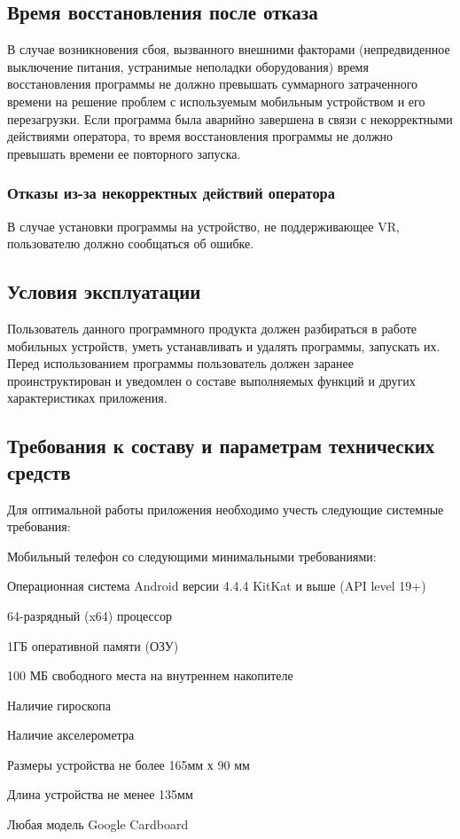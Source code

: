 \subsection{Время восстановления после отказа}
В случае возникновения сбоя, вызванного внешними факторами (непредвиденное выключение питания, 
устранимые неполадки оборудования) время восстановления программы не должно превышать суммарного 
затраченного времени на решение проблем с используемым мобильным устройством и его перезагрузки. Если 
программа была аварийно завершена в связи с некорректными действиями оператора, то время восстановления 
программы не должно превышать времени ее повторного запуска.

\subsubsection{Отказы из-за некорректных действий оператора}
В случае установки программы на устройство, не поддерживающее VR, пользователю должно сообщаться об ошибке.


\subsection{Условия эксплуатации}
Пользователь данного программного продукта должен разбираться в работе мобильных устройств, уметь устанавливать и удалять программы, запускать их. Перед использованием программы пользователь должен заранее проинструктирован и уведомлен о составе выполняемых функций и других характеристиках приложения.


\subsection{Требования к составу и параметрам технических средств}
Для оптимальной работы приложения необходимо учесть следующие системные требования:
\begin{my_enumerate}
\item Мобильный телефон со следующими минимальными требованиями:
    \begin{my_enumerate}
   	\item Операционная система Android версии 4.4.4 KitKat и выше (API level 19+)
    \item 64-разрядный (x64) процессор
    \item 1ГБ оперативной памяти (ОЗУ)
    \item 100 МБ свободного места на внутреннем накопителе
    \item Наличие гироскопа
    \item Наличие акселерометра
    \item Размеры устройства не более 165мм х 90 мм
    \item Длина устройства не менее 135мм
    \end{my_enumerate}
\item Любая модель Google Cardboard
\end{my_enumerate}


